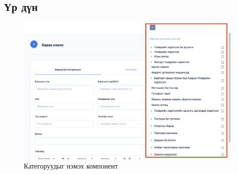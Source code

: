 \subsection{Үр дүн}
\begin{figure}[h]
	\centering
	\includegraphics[scale=0.2]{src/images/category-add.png}
	\caption{Категоруудыг нэмэх компонент}
\end{figure}
